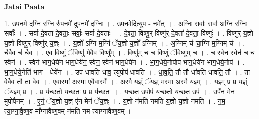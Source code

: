 \documentclass[17pt]{extarticle}
\begin{document}
\textbf{Jatai Paata} \newline

1. उ॒प॒नमे॑ द॒ग्नि र॒ग्नि रु॑प॒नमे॑ दुप॒नमे॑ द॒ग्निः । . उ॒प॒नमे॒दित्यु॑प - नमे᳚त् । . अ॒ग्निः सर्वाः॒ सर्वा॑ अ॒ग्नि र॒ग्निः सर्वाः᳚ । . सर्वा॑ दे॒वता॑ दे॒वताः॒ सर्वाः॒ सर्वा॑ दे॒वताः᳚ । . दे॒वता॒ विष्णु॒र् विष्णु॑र् दे॒वता॑ दे॒वता॒ विष्णुः॑ । . विष्णु॑र् य॒ज्ञो य॒ज्ञो विष्णु॒र् विष्णु॑र् य॒ज्ञ्ः । . य॒ज्ञो᳚ ऽग्नि म॒ग्निं ॅय॒ज्ञो य॒ज्ञो᳚ ऽग्निम् । . अ॒ग्निम् च॑ चा॒ग्नि म॒ग्निम् च॑ । . चै॒वैव च॑ चै॒व । . ए॒व विष्णुं॒ ॅविष्णु॑ मे॒वैव विष्णु᳚म् । . विष्णु॑म् च च॒ विष्णुं॒ ॅविष्णु॑म् च । . च॒ स्वेन॒ स्वेन॑ च च॒ स्वेन॑ । . स्वेन॑ भाग॒धेये॑न भाग॒धेये॑न॒ स्वेन॒ स्वेन॑ भाग॒धेये॑न । . भा॒ग॒धेये॒नोपोप॑ भाग॒धेये॑न भाग॒धेये॒नोप॑ । . भा॒ग॒धेये॒नेति॑ भाग - धेये॑न । . उप॑ धावति धाव॒ त्युपोप॑ धावति । . धा॒व॒ति॒ तौ तौ धा॑वति धावति॒ तौ । . ता वे॒वैव तौ ता वे॒व । . ए॒वास्मा॑ अस्मा ए॒वैवास्मै᳚ । . अ॒स्मै॒ य॒ज्ञ्ं ॅय॒ज्ञ् म॑स्मा अस्मै य॒ज्ञ्म् । . य॒ज्ञ्म् प्र प्र य॒ज्ञ्ं ॅय॒ज्ञ्म् प्र । . प्र य॑च्छतो यच्छतः॒ प्र प्र य॑च्छतः । . य॒च्छ॒त॒ उपोप॑ यच्छतो यच्छत॒ उप॑ । . उपै॑न मेन॒ मुपोपै॑नम् । . ए॒नं॒ ॅय॒ज्ञो य॒ज्ञ् ए॑न मेनं ॅय॒ज्ञ्ः । . य॒ज्ञो न॑मति नमति य॒ज्ञो य॒ज्ञो न॑मति । . न॒म॒ त्या॒ग्ना॒वै॒ष्ण॒व मा᳚ग्नावैष्ण॒वम् न॑मति नम त्याग्नावैष्ण॒वम् । \newline
\end{document}
